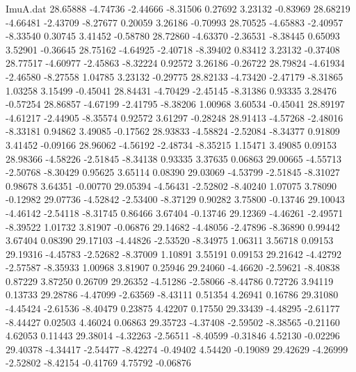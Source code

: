 \begin{filecontents}{ImuA.dat}
  28.65888   -4.74736   -2.44666   -8.31506    0.27692    3.23132   -0.83969
  28.68219   -4.66481   -2.43709   -8.27677    0.20059    3.26186   -0.70993
  28.70525   -4.65883   -2.40957   -8.33540    0.30745    3.41452   -0.58780
  28.72860   -4.63370   -2.36531   -8.38445    0.65093    3.52901   -0.36645
  28.75162   -4.64925   -2.40718   -8.39402    0.83412    3.23132   -0.37408
  28.77517   -4.60977   -2.45863   -8.32224    0.92572    3.26186   -0.26722
  28.79824   -4.61934   -2.46580   -8.27558    1.04785    3.23132   -0.29775
  28.82133   -4.73420   -2.47179   -8.31865    1.03258    3.15499   -0.45041
  28.84431   -4.70429   -2.45145   -8.31386    0.93335    3.28476   -0.57254
  28.86857   -4.67199   -2.41795   -8.38206    1.00968    3.60534   -0.45041
  28.89197   -4.61217   -2.44905   -8.35574    0.92572    3.61297   -0.28248
  28.91413   -4.57268   -2.48016   -8.33181    0.94862    3.49085   -0.17562
  28.93833   -4.58824   -2.52084   -8.34377    0.91809    3.41452   -0.09166
  28.96062   -4.56192   -2.48734   -8.35215    1.15471    3.49085    0.09153
  28.98366   -4.58226   -2.51845   -8.34138    0.93335    3.37635    0.06863
  29.00665   -4.55713   -2.50768   -8.30429    0.95625    3.65114    0.08390
  29.03069   -4.53799   -2.51845   -8.31027    0.98678    3.64351   -0.00770
  29.05394   -4.56431   -2.52802   -8.40240    1.07075    3.78090   -0.12982
  29.07736   -4.52842   -2.53400   -8.37129    0.90282    3.75800   -0.13746
  29.10043   -4.46142   -2.54118   -8.31745    0.86466    3.67404   -0.13746
  29.12369   -4.46261   -2.49571   -8.39522    1.01732    3.81907   -0.06876
  29.14682   -4.48056   -2.47896   -8.36890    0.99442    3.67404    0.08390
  29.17103   -4.44826   -2.53520   -8.34975    1.06311    3.56718    0.09153
  29.19316   -4.45783   -2.52682   -8.37009    1.10891    3.55191    0.09153
  29.21642   -4.42792   -2.57587   -8.35933    1.00968    3.81907    0.25946
  29.24060   -4.46620   -2.59621   -8.40838    0.87229    3.87250    0.26709
  29.26352   -4.51286   -2.58066   -8.44786    0.72726    3.94119    0.13733
  29.28786   -4.47099   -2.63569   -8.43111    0.51354    4.26941    0.16786
  29.31080   -4.45424   -2.61536   -8.40479    0.23875    4.42207    0.17550
  29.33439   -4.48295   -2.61177   -8.44427    0.02503    4.46024    0.06863
  29.35723   -4.37408   -2.59502   -8.38565   -0.21160    4.62053    0.11443
  29.38014   -4.32263   -2.56511   -8.40599   -0.31846    4.52130   -0.02296
  29.40378   -4.34417   -2.54477   -8.42274   -0.49402    4.54420   -0.19089
  29.42629   -4.26999   -2.52802   -8.42154   -0.41769    4.75792   -0.06876

\end{filecontents}
